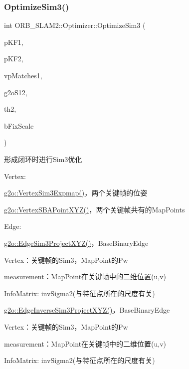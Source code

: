 \subsubsection{\texorpdfstring{Optimize\+Sim3()}{OptimizeSim3()}}
{\footnotesize\ttfamily int O\+R\+B\+\_\+\+S\+L\+A\+M2\+::\+Optimizer\+::\+Optimize\+Sim3 (\begin{DoxyParamCaption}\item[{\mbox{\hyperlink{class_o_r_b___s_l_a_m2_1_1_key_frame}{Key\+Frame}} $\ast$}]{p\+K\+F1,  }\item[{\mbox{\hyperlink{class_o_r_b___s_l_a_m2_1_1_key_frame}{Key\+Frame}} $\ast$}]{p\+K\+F2,  }\item[{std\+::vector$<$ \mbox{\hyperlink{class_o_r_b___s_l_a_m2_1_1_map_point}{Map\+Point}} $\ast$$>$ \&}]{vp\+Matches1,  }\item[{\mbox{\hyperlink{structg2o_1_1_sim3}{g2o\+::\+Sim3}} \&}]{g2o\+S12,  }\item[{const float}]{th2,  }\item[{const bool}]{b\+Fix\+Scale }\end{DoxyParamCaption})\hspace{0.3cm}{\ttfamily [static]}}



形成闭环时进行\+Sim3优化 


\begin{DoxyEnumerate}
\item Vertex\+:
\begin{DoxyItemize}
\item \mbox{\hyperlink{classg2o_1_1_vertex_sim3_expmap}{g2o\+::\+Vertex\+Sim3\+Expmap()}}，两个关键帧的位姿
\item \mbox{\hyperlink{classg2o_1_1_vertex_s_b_a_point_x_y_z}{g2o\+::\+Vertex\+S\+B\+A\+Point\+X\+Y\+Z()}}，两个关键帧共有的\+Map\+Points
\end{DoxyItemize}
\item Edge\+:
\begin{DoxyItemize}
\item \mbox{\hyperlink{classg2o_1_1_edge_sim3_project_x_y_z}{g2o\+::\+Edge\+Sim3\+Project\+X\+Y\+Z()}}，\+Base\+Binary\+Edge
\begin{DoxyItemize}
\item Vertex：关键帧的\+Sim3，\+Map\+Point的\+Pw
\item measurement：\+Map\+Point在关键帧中的二维位置(u,v)
\item Info\+Matrix\+: inv\+Sigma2(与特征点所在的尺度有关)
\end{DoxyItemize}
\item \mbox{\hyperlink{classg2o_1_1_edge_inverse_sim3_project_x_y_z}{g2o\+::\+Edge\+Inverse\+Sim3\+Project\+X\+Y\+Z()}}，\+Base\+Binary\+Edge
\begin{DoxyItemize}
\item Vertex：关键帧的\+Sim3，\+Map\+Point的\+Pw
\item measurement：\+Map\+Point在关键帧中的二维位置(u,v)
\item Info\+Matrix\+: inv\+Sigma2(与特征点所在的尺度有关)
\end{DoxyItemize}
\end{DoxyItemize}
\end{DoxyEnumerate}



